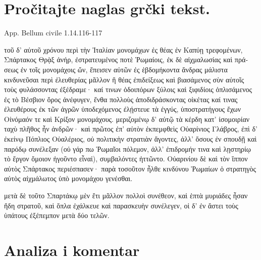 \section*{Pročitajte naglas grčki tekst.}

App. Bellum civile 1.14.116-117


\medskip


{\large

\begin{greek}

\noindent  τοῦ δ' αὐτοῦ χρόνου περὶ τὴν Ἰταλίαν μονομάχων ἐς θέας ἐν Καπύῃ τρεφομένων, Σπάρτακος Θρᾲξ ἀνήρ, ἐστρατευμένος ποτὲ Ῥωμαίοις, ἐκ δὲ αἰχμαλωσίας καὶ πράσεως ἐν τοῖς μονομάχοις ὤν, ἔπεισεν αὐτῶν ἐς ἑβδομήκοντα ἄνδρας μάλιστα κινδυνεῦσαι περὶ ἐλευθερίας μᾶλλον ἢ θέας ἐπιδείξεως καὶ βιασάμενος σὺν αὐτοῖς τοὺς φυλάσσοντας ἐξέδραμε· καί τινων ὁδοιπόρων ξύλοις καὶ ξιφιδίοις ὁπλισάμενος ἐς τὸ Βέσβιον ὄρος ἀνέφυγεν, ἔνθα πολλοὺς ἀποδιδράσκοντας οἰκέτας καί τινας ἐλευθέρους ἐκ τῶν ἀγρῶν ὑποδεχόμενος ἐλῄστευε τὰ ἐγγύς, ὑποστρατήγους ἔχων Οἰνόμαόν τε καὶ Κρίξον μονομάχους. μεριζομένῳ δ' αὐτῷ τὰ κέρδη κατ' ἰσομοιρίαν ταχὺ πλῆθος ἦν ἀνδρῶν· καὶ πρῶτος ἐπ' αὐτὸν ἐκπεμφθεὶς Οὐαρίνιος Γλάβρος, ἐπὶ δ' ἐκείνῳ Πόπλιος Οὐαλέριος, οὐ πολιτικὴν στρατιὰν ἄγοντες, ἀλλ' ὅσους ἐν σπουδῇ καὶ παρόδῳ συνέλεξαν (οὐ γάρ πω Ῥωμαῖοι πόλεμον, ἀλλ' ἐπιδρομήν τινα καὶ λῃστηρίῳ τὸ ἔργον ὅμοιον ἡγοῦντο εἶναἰ), συμβαλόντες ἡττῶντο. Οὐαρινίου δὲ καὶ τὸν ἵππον αὐτὸς Σπάρτακος περιέσπασεν· παρὰ τοσοῦτον ἦλθε κινδύνου Ῥωμαίων ὁ στρατηγὸς αὐτὸς αἰχμάλωτος ὑπὸ μονομάχου γενέσθαι.

μετὰ δὲ τοῦτο Σπαρτάκῳ μὲν ἔτι μᾶλλον πολλοὶ συνέθεον, καὶ ἑπτὰ μυριάδες ἦσαν ἤδη στρατοῦ, καὶ ὅπλα ἐχάλκευε καὶ παρασκευὴν συνέλεγεν, οἱ δ' ἐν ἄστει τοὺς ὑπάτους ἐξέπεμπον μετὰ δύο τελῶν.

\end{greek}

}


\section*{Analiza i komentar}



